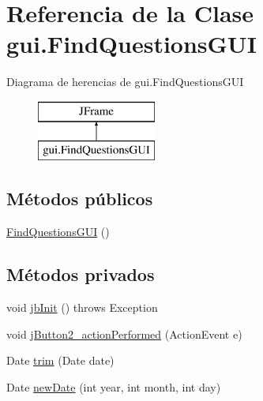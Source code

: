 \hypertarget{classgui_1_1FindQuestionsGUI}{}\section{Referencia de la Clase gui.\+Find\+Questions\+G\+UI}
\label{classgui_1_1FindQuestionsGUI}
Diagrama de herencias de gui.\+Find\+Questions\+G\+UI\begin{figure}[H]
\begin{center}
\leavevmode
\includegraphics[height=2.000000cm]{classgui_1_1FindQuestionsGUI}
\end{center}
\end{figure}
\subsection*{Métodos públicos}
\begin{DoxyCompactItemize}
\item 
\mbox{\hyperlink{classgui_1_1FindQuestionsGUI_ab650ec475d8d7e0861cb35ebc66b86b5}{Find\+Questions\+G\+UI}} ()
\end{DoxyCompactItemize}
\subsection*{Métodos privados}
\begin{DoxyCompactItemize}
\item 
void \mbox{\hyperlink{classgui_1_1FindQuestionsGUI_aad17c86d2c85160c905e9daec2406c2f}{jb\+Init}} ()  throws Exception 	
\item 
void \mbox{\hyperlink{classgui_1_1FindQuestionsGUI_a6a37a659df1fc28f79c4f8fa20ba5dcc}{j\+Button2\+\_\+action\+Performed}} (Action\+Event e)
\item 
Date \mbox{\hyperlink{classgui_1_1FindQuestionsGUI_a6156ed3f274fcc9d14722f62a96ac73e}{trim}} (Date date)
\item 
Date \mbox{\hyperlink{classgui_1_1FindQuestionsGUI_ac4294b9a4abc6073fc9151ef97929b98}{new\+Date}} (int year, int month, int day)
\end{DoxyCompactItemize}
